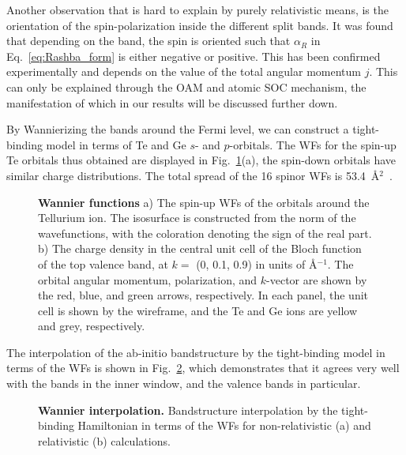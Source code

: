 Another observation that is hard to explain by purely relativistic means, is the orientation of the spin-polarization inside the different split bands.
It was found that depending on the band, the spin is oriented such that $\alpha_R$ in Eq.~\ref{eq:Rashba_form} is either negative or positive. 
This has been confirmed experimentally \cite{Krempasky2015} and depends on the value of the total angular momentum $j$.
This can only be explained through the OAM and atomic SOC mechanism, the manifestation of which in our results will be discussed further down.

By Wannierizing the bands around the Fermi level, we can construct a tight-binding model in terms of Te and Ge $s$- and $p$-orbitals.
The WFs for the spin-up Te orbitals thus obtained are displayed in Fig.~\ref{fig:Rashba_wannierfunctions}(a), the spin-down orbitals have similar charge distributions.
The total spread of the 16 spinor WFs is 53.4~\AA$^2$~.
\begin{figure}[h]
\caption{\label{fig:Rashba_wannierfunctions}{\bf Wannier functions} a) The spin-up WFs of the orbitals around the Tellurium ion. The isosurface is constructed from the norm of the wavefunctions, with the coloration denoting the sign of the real part. b) The charge density in the central unit cell of the Bloch function of the top valence band, at $k=$ (0, 0.1, 0.9) in units of \AA$^{-1}$. The orbital angular momentum, polarization, and $k$-vector are shown by the red, blue, and green arrows, respectively. In each panel, the unit cell is shown by the wireframe, and the Te and Ge ions are yellow and grey, respectively.}
\end{figure}

The interpolation of the ab-initio bandstructure by the tight-binding model in terms of the WFs is shown in Fig.~\ref{fig:Rashba_wannierization}, which demonstrates that it agrees very well with the bands in the inner window, and the valence bands in particular. 
\begin{figure}[h]
\caption{\label{fig:Rashba_wannierization}{\bf Wannier interpolation.} Bandstructure interpolation by the tight-binding Hamiltonian in terms of the WFs for non-relativistic (a) and relativistic (b) calculations.}
\end{figure}

